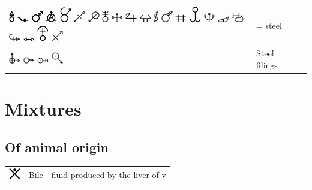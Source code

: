 \documentclass[british,final,landscape]{scrartcl}
\begin{document}
\begin{refsection}
\begin{supertabular}{p{0.3\textwidth}p{0.34\textwidth}p{0.34\textwidth}}
   \includegraphics[height=5mm]{Metals/Steel}  \includegraphics[width=5mm]{Metals/Steel2}  \includegraphics[width=5mm]{Metals/Steel3} \includegraphics[width=5mm]{Metals/Steel4}  \includegraphics[width=5mm]{Metals/Steel5}  \includegraphics[width=5mm]{Metals/Steel6} \includegraphics[width=5mm]{Metals/Steel7}  \includegraphics[height=5mm]{Metals/Steel8} \includegraphics[width=5mm]{Metals/Steel9} \includegraphics[width=5mm]{Metals/Steel10} \includegraphics[width=5mm]{Metals/Steel11} \includegraphics[height=5mm]{Metals/Steel12} \includegraphics[width=5mm]{Metals/Steel13} \includegraphics[width=5mm]{Metals/Steel14} \includegraphics[width=5mm]{Metals/Steel15} \includegraphics[width=5mm]{Metals/Steel16} \includegraphics[width=5mm]{Metals/Steel17} \includegraphics[width=5mm]{Metals/Steel18} \includegraphics[width=5mm]{Metals/Steel19} \includegraphics[width=5mm]{Metals/Steel20} \includegraphics[width=5mm]{Metals/Steel21} \includegraphics[width=5mm]{Metals/Steel22} &  = steel & \\
   \includegraphics[width=5mm]{Metals/SteelFilings} \includegraphics[width=5mm]{Metals/SteelFilings2} \includegraphics[width=5mm]{Metals/SteelFilings3} \includegraphics[width=5mm]{Metals/SteelFilings4} & Steel filings & \\
  \end{supertabular}

\section{Mixtures}

\subsection{Of animal origin}

 \tablelasttail{\bottomrule}
 \begin{supertabular}{p{0.3\textwidth}p{0.34\textwidth}p{0.34\textwidth}}
   \includegraphics[width=5mm]{Animal/Bile}  & Bile & fluid produced by the liver of v
\end{supertabular}
\end{refsection}
\end{document}
